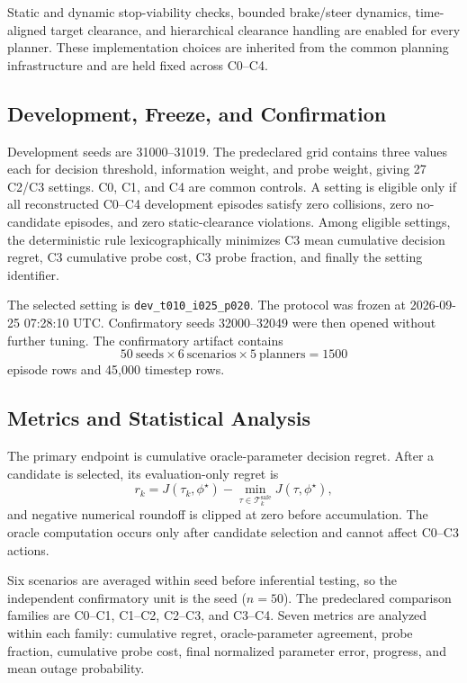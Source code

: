 \documentclass[journal]{IEEEtran}
\begin{document}
Static and dynamic stop-viability checks, bounded brake/steer dynamics, time-aligned target clearance, and hierarchical clearance handling are enabled for every planner. These implementation choices are inherited from the common planning infrastructure and are held fixed across C0--C4.

\subsection{Development, Freeze, and Confirmation}
Development seeds are 31000--31019. The predeclared grid contains three values each for decision threshold, information weight, and probe weight, giving 27 C2/C3 settings. C0, C1, and C4 are common controls. A setting is eligible only if all reconstructed C0--C4 development episodes satisfy zero collisions, zero no-candidate episodes, and zero static-clearance violations. Among eligible settings, the deterministic rule lexicographically minimizes C3 mean cumulative decision regret, C3 cumulative probe cost, C3 probe fraction, and finally the setting identifier.

The selected setting is \texttt{dev\_t010\_i025\_p020}. The protocol was frozen at 2026-09-25 07:28:10 UTC. Confirmatory seeds 32000--32049 were then opened without further tuning. The confirmatory artifact contains
\[
50\ \text{seeds}\times 6\ \text{scenarios}\times 5\ \text{planners}
=1500
\]
episode rows and 45,000 timestep rows.

\subsection{Metrics and Statistical Analysis}
The primary endpoint is cumulative oracle-parameter decision regret. After a candidate is selected, its evaluation-only regret is
\begin{equation}
r_k=
J(\tau_k,\phi^\star)
-
\min_{\tau\in\mathcal{T}^{\mathrm{safe}}_k}
J(\tau,\phi^\star),
\end{equation}
and negative numerical roundoff is clipped at zero before accumulation. The oracle computation occurs only after candidate selection and cannot affect C0--C3 actions.

Six scenarios are averaged within seed before inferential testing, so the independent confirmatory unit is the seed ($n=50$). The predeclared comparison families are C0--C1, C1--C2, C2--C3, and C3--C4. Seven metrics are analyzed within each family: cumulative regret, oracle-parameter agreement, probe fraction, cumulative probe cost, final normalized parameter error, progress, and mean outage probability.
\end{document}

